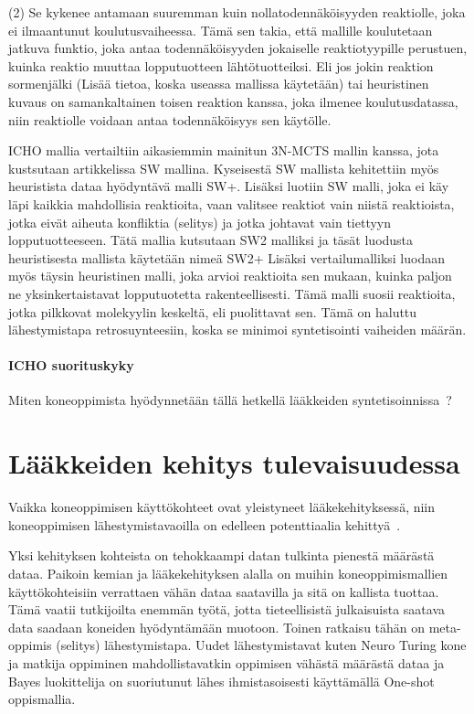 \documentclass[finnish,twoside,censored,tkt,sw-line]{HYthesisML}
\begin{document}
(2) Se kykenee antamaan suuremman kuin nollatodennäköisyyden reaktiolle, joka ei ilmaantunut koulutusvaiheessa.
Tämä sen takia, että mallille koulutetaan jatkuva funktio, joka antaa todennäköisyyden jokaiselle reaktiotyypille perustuen, kuinka reaktio muuttaa lopputuotteen lähtötuotteiksi.
Eli jos jokin reaktion sormenjälki (Lisää tietoa, koska useassa mallissa käytetään) tai heuristinen kuvaus on samankaltainen toisen reaktion kanssa, joka ilmenee koulutusdatassa, niin reaktiolle voidaan antaa todennäköisyys sen käytölle.

ICHO mallia vertailtiin aikasiemmin mainitun 3N-MCTS mallin kanssa, jota kustsutaan artikkelissa SW mallina.
Kyseisestä SW mallista kehitettiin myös heuristista dataa hyödyntävä malli SW+.
Lisäksi luotiin SW malli, joka ei käy läpi kaikkia mahdollisia reaktioita, vaan valitsee reaktiot vain niistä reaktioista, jotka eivät aiheuta konfliktia (selitys) ja jotka johtavat vain tiettyyn lopputuotteeseen.
Tätä mallia kutsutaan SW2 malliksi ja täsät luodusta heuristisesta mallista käytetään nimeä SW2+
Lisäksi vertailumalliksi luodaan myös täysin heuristinen malli, joka arvioi reaktioita sen mukaan, kuinka paljon ne yksinkertaistavat lopputuotetta rakenteellisesti.
Tämä malli suosii reaktioita, jotka pilkkovat molekyylin keskeltä, eli puolittavat sen.
Tämä on haluttu lähestymistapa retrosuynteesiin, koska se minimoi syntetisointi vaiheiden määrän.

\subsubsection{ICHO suorituskyky}


Miten koneoppimista hyödynnetään tällä hetkellä lääkkeiden syntetisoinnissa~\cite{SeglerMarwinHS2018Pcsw,ShaharHarelAndKiraRadinsky,ShinBonggun}?

\chapter{Lääkkeiden kehitys tulevaisuudessa}

Vaikka koneoppimisen käyttökohteet ovat yleistyneet lääkekehityksessä, niin koneoppimisen lähestymistavaoilla on edelleen potenttiaalia kehittyä~\cite{ButlerKeithT2018Mlfm}.

Yksi kehityksen kohteista on tehokkaampi datan tulkinta pienestä määrästä dataa.
Paikoin kemian ja lääkekehityksen alalla on muihin koneoppimismallien käyttökohteisiin verrattaen vähän dataa saatavilla ja sitä on kallista tuottaa.
Tämä vaatii tutkijoilta enemmän työtä, jotta tieteellisistä julkaisuista saatava data saadaan koneiden hyödyntämään muotoon.
Toinen ratkaisu tähän on meta-oppimis (selitys) lähestymistapa.
Uudet lähestymistavat kuten Neuro Turing kone ja matkija oppiminen mahdollistavatkin oppimisen vähästä määrästä dataa ja Bayes luokittelija on suoriutunut lähes ihmistasoisesti käyttämällä One-shot oppismallia.
\end{document}
